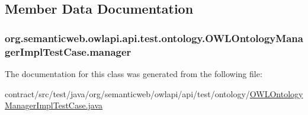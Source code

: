 \subsection{Member Data Documentation}
\hypertarget{classorg_1_1semanticweb_1_1owlapi_1_1api_1_1test_1_1ontology_1_1_o_w_l_ontology_manager_impl_test_case_af725ff972213852fbd95a52362fcdfa1}{
\subsubsection[{manager}]{ org.\-semanticweb.\-owlapi.\-api.\-test.\-ontology.\-O\-W\-L\-Ontology\-Manager\-Impl\-Test\-Case.\-manager\hspace{0.3cm}{\ttfamily [private]}}}\label{classorg_1_1semanticweb_1_1owlapi_1_1api_1_1test_1_1ontology_1_1_o_w_l_ontology_manager_impl_test_case_af725ff972213852fbd95a52362fcdfa1}


The documentation for this class was generated from the following file\-:\begin{DoxyCompactItemize}
\item 
contract/src/test/java/org/semanticweb/owlapi/api/test/ontology/\hyperlink{_o_w_l_ontology_manager_impl_test_case_8java}{O\-W\-L\-Ontology\-Manager\-Impl\-Test\-Case.\-java}\end{DoxyCompactItemize}
